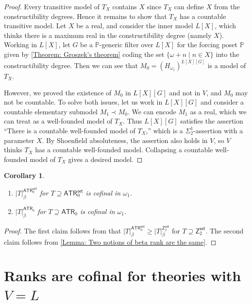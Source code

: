 \documentclass{amsart}
\newtheorem{corollary}[corollary]{Corollary}
\theoremstyle{remark}
\newcommand{\ATR}{\mathsf{ATR}}
\newcommand{\set}{\mathsf{set}}
\begin{document}
\begin{proof}
    Every transitive model of $T_X$ contains $X$ since $T_X$ can define $X$ from the constructibility degrees. Hence it remains to show that $T_X$ has a countable transitive model.
    Let $X$ be a real, and consider the inner model $L[X]$, which thinks there is a maximum real in the constructibility degree (namely $X$).
    Working in $L[X]$, let $G$ be a $\mathbb{P}$-generic filter over $L[X]$ for the forcing poset $\mathbb{P}$ given by \autoref{Theorem: Groszek's theorem} coding the set $\{\omega+n\mid n\in X\}$ into the constructibility degree. Then we can see that $M_0 = (H_{\omega_1})^{L[X][G]}$ is a model of $T_X$.
    
    However, we proved the existence of $M_0$ in $L[X][G]$ and not in $V$, and $M_0$ may not be countable. To solve both issues, let us work in $L[X][G]$ and consider a countable elementary submodel $M_1\prec M_0$. We can encode $M_1$ as a real, which we can treat as a well-founded model of $T_X$. Thus $L[X][G]$ satisfies the assertion ``There is a countable well-founded model of $T_X$,'' which is a $\Sigma^1_2$-assertion with a parameter $X$.
    By Shoenfield absoluteness, the assertion also holds in $V$, so $V$ thinks $T_X$ has a countable well-founded model. Collapsing a countable well-founded model of $T_X$ gives a desired model.
\end{proof}

\begin{corollary} \phantom{a}
    \begin{enumerate}
        \item $|T|_{\beta}^{\ATR_0^\set}$ for $T\supseteq \ATR_0^\set$ is cofinal in $\omega_1$.
        \item $|T|_{\beta}^{\ATR_0}$ for $T\supseteq \ATR_0$ is cofinal in $\omega_1$.
    \end{enumerate}
\end{corollary}
\begin{proof}
    The first claim follows from that $|T|_{\beta}^{\ATR_0^\set}\ge |T|_{\beta}^{\mathsf{Z}_2^\set}$ for $T\supseteq \mathsf{Z}_2^\set$. The second claim follows from \autoref{Lemma: Two notions of beta rank are the same}.
\end{proof}

\section{Ranks are cofinal for theories with \texorpdfstring{$V=L$}{V=L}}
\end{document}
